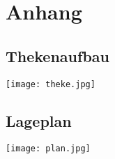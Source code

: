 \cleardoublepage
\section{Anhang}
\subsection{Thekenaufbau}
\texttt{[image: theke.jpg]}
\cleardoublepage
\subsection{Lageplan}
\texttt{[image: plan.jpg]}
